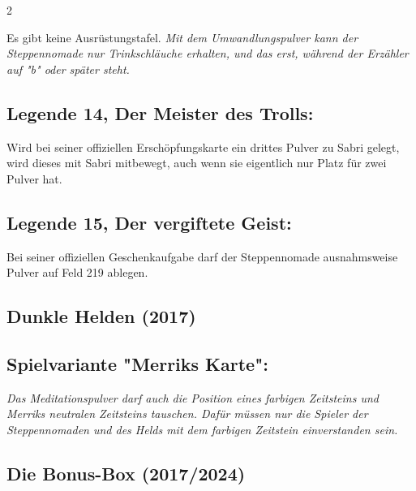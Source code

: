 \documentclass[10pt, a4paper, oneside]{book}
\newcommand{\fan}[1]{\textit{#1}}
\begin{document}
\begin{multicols*}{2}
\begin{bgcolor}
Es gibt keine Ausrüstungstafel. \fan{Mit dem Umwandlungspulver kann der Steppennomade nur Trinkschläuche erhalten, und das erst, während der Erzähler auf "b" oder später steht.}





\subsection{Legende 14, Der Meister des Trolls:}

Wird bei seiner offiziellen Erschöpfungskarte ein drittes Pulver zu Sabri gelegt, wird dieses mit Sabri mitbewegt, auch wenn sie eigentlich nur Platz für zwei Pulver hat.
\supercite{94521}


\subsection{Legende 15, Der vergiftete Geist:}

Bei seiner offiziellen Geschenkaufgabe darf der Steppennomade ausnahmsweise Pulver auf Feld 219 ablegen.

\end{bgcolor}



\begin{nobgcolor}

\section{Dunkle Helden (2017)}

\subsection{Spielvariante "Merriks Karte":}

\fan{Das Meditationspulver darf auch die Position eines farbigen Zeitsteins und Merriks neutralen Zeitsteins tauschen. Dafür müssen nur die Spieler der Steppennomaden und des Helds mit dem farbigen Zeitstein einverstanden sein.}

\end{nobgcolor}


\columnbreak




\begin{bgcolor}[color-bb]
\section{Die Bonus-Box (2017/2024)}



\end{bgcolor}
\end{multicols*}
\end{document}

